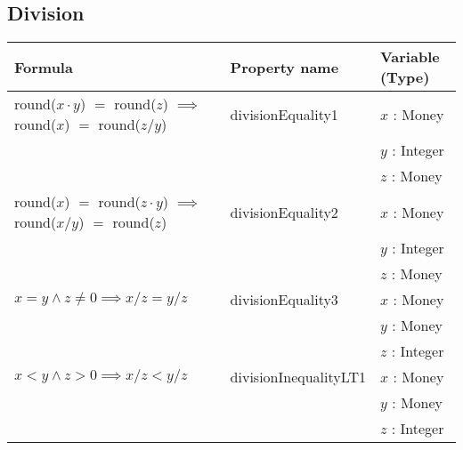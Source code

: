 \subsection*{Division}
\label{ssct:properties_division_updated}
\begin{table}[!ht]
\centering
\begin{tabular}{lll}
\hline
                        \textbf{Formula}                                        & \textbf{Property name} & \textbf{Variable (Type)} \\ \hline
\rowcolor[HTML]{EFEFEF} round($x \cdot y$) $=$ round($z$) $\implies$
                                       round($x$) $=$ round($z / y$)       & divisionEquality1      & $x$ : Money              \\
\rowcolor[HTML]{EFEFEF}                                                         &                        & $y$ : Integer            \\
\rowcolor[HTML]{EFEFEF}                                                         &                        & $z$ : Money              \\
                        round($x$) $=$ round($z \cdot y$) $\implies$
												               round($x / y$) $=$ round($z$)       & divisionEquality2      & $x$ : Money              \\
                                                                                &                        & $y$ : Integer            \\
                                                                                &                        & $z$ : Money              \\
\rowcolor[HTML]{EFEFEF} $x = y \land z \neq 0 \implies x / z = y / z$ & divisionEquality3      & $x$ : Money              \\
\rowcolor[HTML]{EFEFEF}                                                         &                        & $y$ : Money              \\
\rowcolor[HTML]{EFEFEF}                                                         &                        & $z$ : Integer            \\
												$x < y \land z > 0 \implies x / z < y / z$              & divisionInequalityLT1  & $x$ : Money              \\
																																			          &                        & $y$ : Money              \\
																																			          &                        & $z$ : Integer            \\

\end{tabular}
\end{table}
